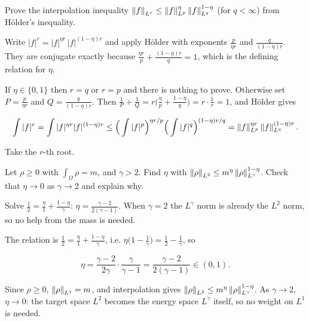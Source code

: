 \begin{exercise}
  Prove the interpolation inequality $\left\lVert f\right\rVert_{L^r} \le \left\lVert f\right\rVert_{L^p}^{\eta}\left\lVert f\right\rVert_{L^q}^{1-\eta}$ (for $q < \infty$) from Hölder's inequality.
  \begin{hint}
    Write $|f|^r = |f|^{\eta r}\,|f|^{(1-\eta)r}$ and apply Hölder with exponents $\frac{p}{\eta r}$ and $\frac{q}{(1-\eta)r}$. They are conjugate exactly because $\frac{\eta r}{p} + \frac{(1-\eta)r}{q} = 1$, which is the defining relation for $\eta$.
  \end{hint}
  \begin{solution}
    If $\eta \in \{0,1\}$ then $r = q$ or $r = p$ and there is nothing to prove. Otherwise set $P = \frac{p}{\eta r}$ and $Q = \frac{q}{(1-\eta)r}$. Then $\frac1P + \frac1Q = r\big(\frac\eta p + \frac{1-\eta}{q}\big) = r\cdot\frac1r = 1$, and Hölder gives

    \[ \int|f|^r = \int|f|^{\eta r}|f|^{(1-\eta)r} \le \Big(\int|f|^p\Big)^{\eta r/p}\Big(\int|f|^q\Big)^{(1-\eta)r/q}
             = \left\lVert f\right\rVert_{L^p}^{\eta r}\left\lVert f\right\rVert_{L^q}^{(1-\eta)r}. \]

    Take the $r$-th root.
  \end{solution}
\end{exercise}

\begin{exercise}
  Let $\rho \ge 0$ with $\int_\Omega \rho = m$, and $\gamma > 2$. Find $\eta$ with $\left\lVert \rho\right\rVert_{L^2} \le m^{\eta}\left\lVert \rho\right\rVert_{L^\gamma}^{1-\eta}$. Check that $\eta \to 0$ as $\gamma \to 2$ and explain why.
  \begin{hint}
    Solve $\frac12 = \frac{\eta}{1} + \frac{1-\eta}{\gamma}$: $\eta = \frac{\gamma-2}{2(\gamma-1)}$. When $\gamma = 2$ the $L^\gamma$ norm is already the $L^2$ norm, so no help from the mass is needed.
  \end{hint}
  \begin{solution}
    The relation is $\frac12 = \frac\eta1 + \frac{1-\eta}{\gamma}$, i.e. $\eta\big(1 - \frac1\gamma\big) = \frac12 - \frac1\gamma$, so

    \[ \eta = \frac{\gamma-2}{2\gamma}\cdot\frac{\gamma}{\gamma-1} = \frac{\gamma-2}{2(\gamma-1)} \in (0,1). \]

    Since $\rho \ge 0$, $\left\lVert \rho\right\rVert_{L^1} = m$, and interpolation gives $\left\lVert \rho\right\rVert_{L^2} \le m^\eta\left\lVert \rho\right\rVert_{L^\gamma}^{1-\eta}$. As $\gamma \to 2$, $\eta \to 0$: the target space $L^2$ becomes the energy space $L^\gamma$ itself, so no weight on $L^1$ is needed.
  \end{solution}
\end{exercise}

